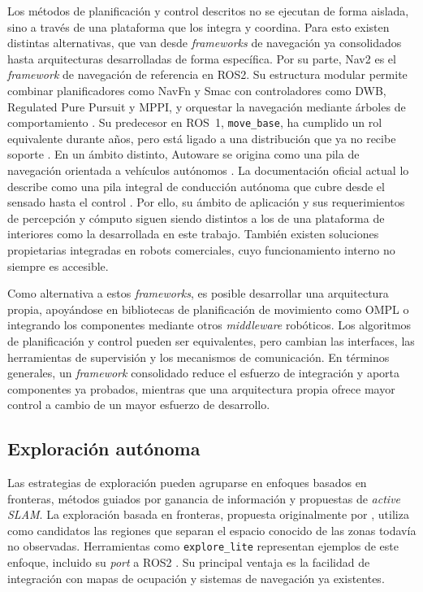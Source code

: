 Los métodos de planificación y control descritos no se ejecutan de forma
aislada, sino a través de una plataforma que los integra y coordina. Para esto
existen distintas alternativas, que van desde \textit{frameworks} de navegación ya
consolidados hasta arquitecturas desarrolladas de forma específica.
Por su parte, Nav2 es el \textit{framework} de navegación de referencia en \gls{ROS2}. Su estructura
modular permite combinar planificadores como NavFn y Smac con controladores
como DWB, Regulated Pure Pursuit y MPPI, y orquestar la navegación mediante
árboles de comportamiento \citep{nav2_doc}. Su predecesor en ROS~1,
\texttt{move\_base}, ha cumplido un rol equivalente durante años, pero está ligado
a una distribución que ya no recibe soporte \citep{ros_noetic_eol}. En un
ámbito distinto, Autoware se origina como una pila de navegación orientada a
vehículos autónomos \citep{kato2018autoware}. La documentación oficial actual
lo describe como una pila integral de conducción autónoma que cubre desde el
sensado hasta el control \citep{autoware2026docs}. Por ello, su ámbito de
aplicación y sus requerimientos de percepción y cómputo siguen siendo
distintos a los de una plataforma de interiores como la desarrollada en este
trabajo. También existen soluciones propietarias integradas en robots
comerciales, cuyo funcionamiento interno no siempre es accesible.

Como alternativa a estos \textit{frameworks}, es posible desarrollar una arquitectura
propia, apoyándose en bibliotecas de planificación de movimiento como OMPL
\citep{sucan2012ompl,ompl2026docs} o integrando los componentes mediante otros
\textit{middleware} robóticos. Los algoritmos
de planificación y control pueden ser equivalentes, pero cambian las
interfaces, las herramientas de supervisión y los mecanismos de comunicación.
En términos generales, un \textit{framework} consolidado reduce el esfuerzo de
integración y aporta componentes ya probados, mientras que una arquitectura
propia ofrece mayor control a cambio de un mayor esfuerzo de desarrollo.

\subsection{Exploración autónoma}
\label{sec:exploracion_alternativas}

Las estrategias de exploración pueden agruparse en enfoques basados en
fronteras, métodos guiados por ganancia de información y propuestas de
\textit{active SLAM}.
La exploración basada en fronteras, propuesta originalmente por
\citet{yamauchi1997frontier}, utiliza como candidatos las regiones que
separan el espacio conocido de las zonas todavía no observadas. Herramientas
como \texttt{explore\_lite} representan ejemplos de este enfoque, incluido
su \textit{port} a \gls{ROS2} \citep{horner_mexplore,alvarez2021mexplore_ros2}. Su
principal ventaja es la facilidad de integración con mapas de ocupación y
sistemas de navegación ya existentes.

